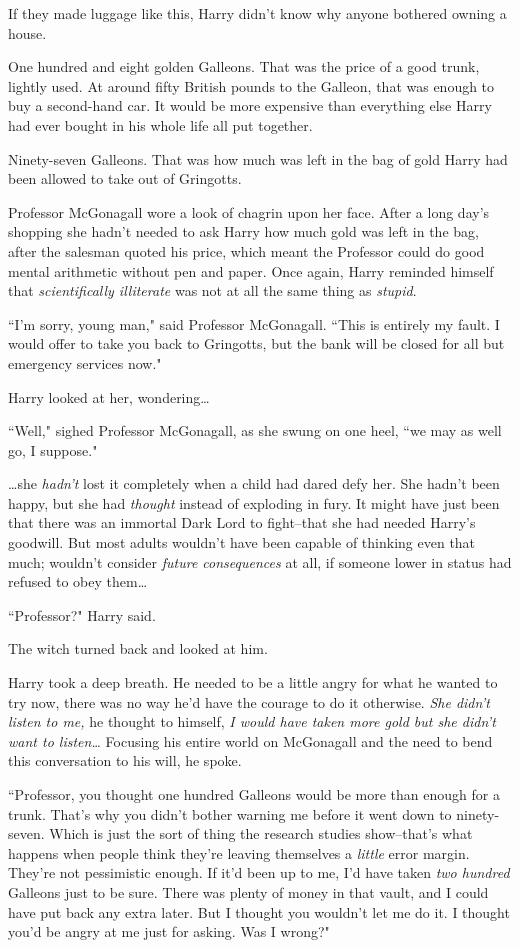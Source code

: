 If they made luggage like this, Harry didn't know why anyone bothered owning a house.

One hundred and eight golden Galleons. That was the price of a good trunk, lightly used. At around fifty British pounds to the Galleon, that was enough to buy a second-hand car. It would be more expensive than everything else Harry had ever bought in his whole life all put together.

Ninety-seven Galleons. That was how much was left in the bag of gold Harry had been allowed to take out of Gringotts.

Professor McGonagall wore a look of chagrin upon her face. After a long day's shopping she hadn't needed to ask Harry how much gold was left in the bag, after the salesman quoted his price, which meant the Professor could do good mental arithmetic without pen and paper. Once again, Harry reminded himself that \emph{scientifically illiterate} was not at all the same thing as \emph{stupid}.

``I'm sorry, young man," said Professor McGonagall. ``This is entirely my fault. I would offer to take you back to Gringotts, but the bank will be closed for all but emergency services now."

Harry looked at her, wondering{\ldots}

``Well," sighed Professor McGonagall, as she swung on one heel, ``we may as well go, I suppose."

{\ldots}she \emph{hadn't} lost it completely when a child had dared defy her. She hadn't been happy, but she had \emph{thought} instead of exploding in fury. It might have just been that there was an immortal Dark Lord to fight\---that she had needed Harry's goodwill. But most adults wouldn't have been capable of thinking even that much; wouldn't consider \emph{future consequences} at all, if someone lower in status had refused to obey them{\ldots}

``Professor?" Harry said.

The witch turned back and looked at him.

Harry took a deep breath. He needed to be a little angry for what he wanted to try now, there was no way he'd have the courage to do it otherwise. \emph{She didn't listen to me,} he thought to himself, \emph{I would have taken more gold but she didn't want to listen{\ldots}} Focusing his entire world on McGonagall and the need to bend this conversation to his will, he spoke.

``Professor, you thought one hundred Galleons would be more than enough for a trunk. That's why you didn't bother warning me before it went down to ninety-seven. Which is just the sort of thing the research studies show\---that's what happens when people think they're leaving themselves a \emph{little} error margin. They're not pessimistic enough. If it'd been up to me, I'd have taken \emph{two hundred} Galleons just to be sure. There was plenty of money in that vault, and I could have put back any extra later. But I thought you wouldn't let me do it. I thought you'd be angry at me just for asking. Was I wrong?"

